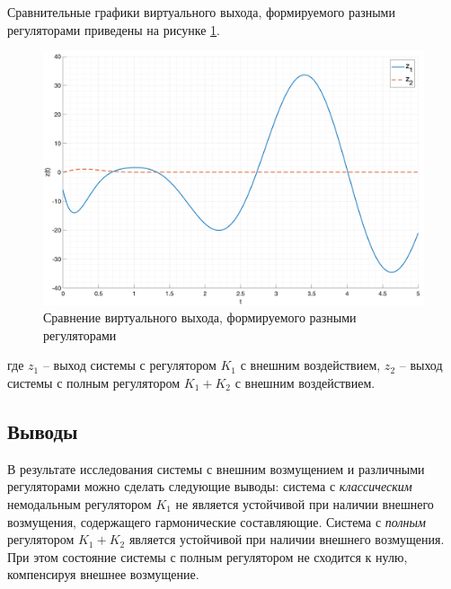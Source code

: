 Сравнительные графики виртуального выхода, формируемого разными регуляторами приведены на рисунке \ref{fig:compare_z}.
\begin{figure}[ht!]
    \centering
    \includegraphics[width=\textwidth]{media/plots/z_cmp.png}
    \caption{Сравнение виртуального выхода, формируемого разными регуляторами}
    \label{fig:compare_z}
\end{figure}
где $z_1$ -- выход системы с регулятором $K_1$ с внешним воздействием, $z_2$ -- выход системы с полным регулятором $K_1 + K_2$ с внешним воздействием.
\FloatBarrier

\subsection{Выводы}
В результате исследования системы с внешним возмущением и различными регуляторами
можно сделать следующие выводы: система с \textit{классическим} немодальным регулятором
$K_1$ не является устойчивой при наличии внешнего возмущения, содержащего гармонические
составляющие. Система с \textit{полным} регулятором $K_1 + K_2$ является устойчивой при наличии 
внешнего возмущения. При этом состояние системы с полным регулятором не сходится к нулю,
компенсируя внешнее возмущение. 
